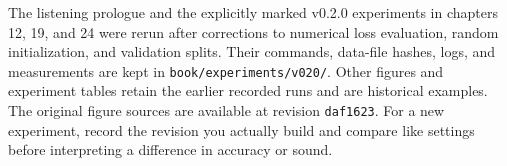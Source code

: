 The listening prologue and the explicitly marked v0.2.0 experiments in
chapters 12, 19, and 24 were rerun after corrections to numerical loss
evaluation, random initialization, and validation splits. Their commands,
data-file hashes, logs, and measurements are kept in
\texttt{book/experiments/v020/}. Other figures and experiment tables
retain the earlier recorded runs and are historical examples. The
original figure sources are available at revision \texttt{daf1623}.
For a new experiment, record the revision you actually build and compare
like settings before interpreting a difference in accuracy or sound.
